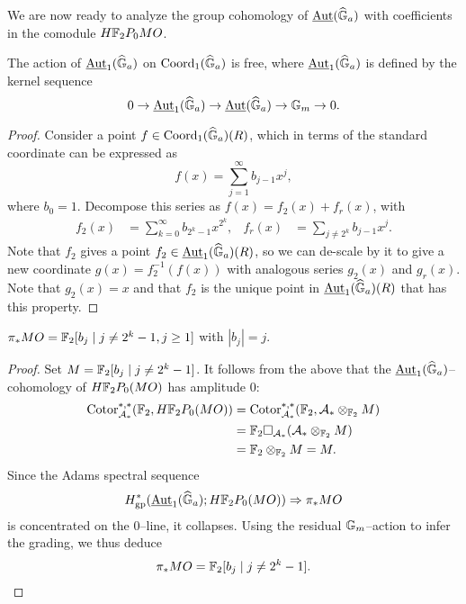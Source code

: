 We are now ready to analyze the group cohomology of $\operatorname{\underline{\smash{\operatorname{Aut}}}}(\widehat{\mathbb G}_a)$ with coefficients in the comodule $H\mathbb F_2P_0 MO$.
\begin{theorem}
The action of $\operatorname{\underline{\smash{\operatorname{Aut}}}}_1(\widehat{\mathbb G}_a)$ on $\operatorname{Coord}_1(\widehat{\mathbb G}_a)$ is free, where $\operatorname{\underline{\smash{\operatorname{Aut}}}}_1(\widehat{\mathbb G}_a)$ is defined by the kernel sequence \[0 \to \operatorname{\underline{\smash{\operatorname{Aut}}}}_1(\widehat{\mathbb G}_a) \to \operatorname{\underline{\smash{\operatorname{Aut}}}}(\widehat{\mathbb G}_a) \to \mathbb G_m \to 0.\]
\end{theorem}
\begin{proof}
Consider a point $f \in \operatorname{Coord}_1(\widehat{\mathbb G}_a)(R)$, which in terms of the standard coordinate can be expressed as \[f(x) = \sum_{j=1}^\infty b_{j-1} x^j,\] where $b_0 = 1$.  Decompose this series as $f(x) = f_2(x) + f_r(x)$, with
\begin{align*}
f_2(x) & = \sum_{k=0}^\infty b_{2^k-1} x^{2^k}, &
f_r(x) & = \sum_{j \ne 2^k} b_{j-1} x^j.
\end{align*}
Note that $f_2$ gives a point $f_2 \in \operatorname{\underline{\smash{\operatorname{Aut}}}}_1(\widehat{\mathbb G}_a)(R)$, so we can de-scale by it to give a new coordinate $g(x) = f_2^{-1}(f(x))$ with analogous series $g_2(x)$ and $g_r(x)$.  Note that $g_2(x) = x$ and that $f_2$ is the unique point in $\operatorname{\underline{\smash{\operatorname{Aut}}}}_1(\widehat{\mathbb G}_a)(R)$ that has this property.
\end{proof}

\begin{corollary}
$\pi_* MO = \mathbb F_2[b_j \mid j \ne 2^k - 1, j \ge 1]$ with $|b_j| = j$.
\end{corollary}
\begin{proof}
Set $M = \mathbb F_2[b_j \mid j \ne 2^k - 1]$.    It follows from the above that the $\operatorname{\underline{\smash{\operatorname{Aut}}}}_1(\widehat{\mathbb G}_a)$--cohomology of $H\mathbb F_2P_0(MO)$ has amplitude $0$:
\begin{align*}
\operatorname{Cotor}_{\mathcal A_*}^{*, *}(\mathbb F_2, H\mathbb F_2P_0(MO)) & = \operatorname{Cotor}_{\mathcal A_*}^{*, *}(\mathbb F_2, \mathcal A_* \otimes_{\mathbb F_2} M) \\
& = \mathbb F_2 \square_{\mathcal A_*} (\mathcal A_* \otimes_{\mathbb F_2} M) \\
& = \mathbb F_2 \otimes_{\mathbb F_2} M = M.
\end{align*}
Since the Adams spectral sequence \[H^*_{\mathrm{gp}}(\operatorname{\underline{\smash{\operatorname{Aut}}}}_1(\widehat{\mathbb G}_a); H\mathbb F_2P_0(MO)) \Rightarrow \pi_* MO\] is concentrated on the $0$--line, it collapses.  Using the residual $\mathbb G_m$--action to infer the grading, we thus deduce \[\pi_* MO = \mathbb F_2[b_j \mid j \ne 2^k-1]. \qedhere\]
\end{proof}

